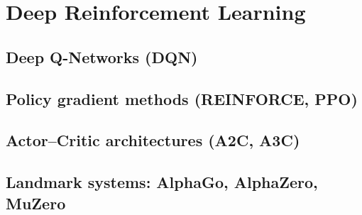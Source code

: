 ﻿\chapter{Deep Reinforcement Learning}
\section{Deep Q-Networks (DQN)}

\section{Policy gradient methods (REINFORCE, PPO)}

\section{Actor–Critic architectures (A2C, A3C)}

\section{Landmark systems: AlphaGo, AlphaZero, MuZero}


